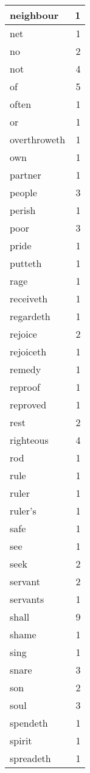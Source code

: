 \begin{center}
\begin{longtable}{l|r}
neighbour & 1\\ \hline 
net & 1\\ \hline 
no & 2\\ \hline 
not & 4\\ \hline 
of & 5\\ \hline 
often & 1\\ \hline 
or & 1\\ \hline 
overthroweth & 1\\ \hline 
own & 1\\ \hline 
partner & 1\\ \hline 
people & 3\\ \hline 
perish & 1\\ \hline 
poor & 3\\ \hline 
pride & 1\\ \hline 
putteth & 1\\ \hline 
rage & 1\\ \hline 
receiveth & 1\\ \hline 
regardeth & 1\\ \hline 
rejoice & 2\\ \hline 
rejoiceth & 1\\ \hline 
remedy & 1\\ \hline 
reproof & 1\\ \hline 
reproved & 1\\ \hline 
rest & 2\\ \hline 
righteous & 4\\ \hline 
rod & 1\\ \hline 
rule & 1\\ \hline 
ruler & 1\\ \hline 
ruler's & 1\\ \hline 
safe & 1\\ \hline 
see & 1\\ \hline 
seek & 2\\ \hline 
servant & 2\\ \hline 
servants & 1\\ \hline 
shall & 9\\ \hline 
shame & 1\\ \hline 
sing & 1\\ \hline 
snare & 3\\ \hline 
son & 2\\ \hline 
soul & 3\\ \hline 
spendeth & 1\\ \hline 
spirit & 1\\ \hline 
spreadeth & 1\\ \hline 

\end{longtable}
\end{center}
